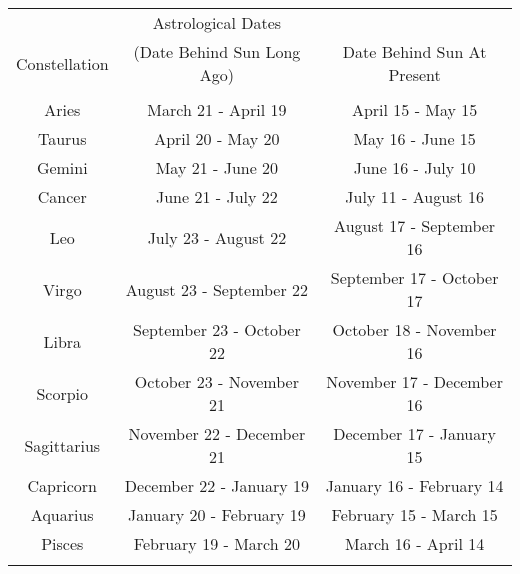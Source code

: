 \documentclass[11pt]{article}
\begin{document}
\begin{center}
	\begin{tabular}{ c c c }
		\hline
		             & Astrological Dates &                          \\ 
		Constellation \hspace{0.5in} & (Date Behind Sun Long Ago) & Date Behind Sun At Present                         \\ \hline
		& & \\ 
		Aries     \hspace{0.5in}  & March 21 - April 19       & April 15 - May 15         \\ 
		Taurus    \hspace{0.5in}  & April 20 - May 20         & May 16 - June 15          \\ 
		Gemini    \hspace{0.5in}  & May 21 - June 20          & June 16 - July 10         \\ 
		Cancer    \hspace{0.5in}  & June 21 - July 22         & July 11 - August 16       \\ 
		Leo        \hspace{0.5in} & July 23 - August 22       & August 17 - September 16  \\ 
		Virgo     \hspace{0.5in}  & August 23 - September 22  & September 17 - October 17 \\ 
		Libra      \hspace{0.5in} & September 23 - October 22 & October 18 - November 16  \\ 
		Scorpio    \hspace{0.5in} & October 23 - November 21  & November 17 - December 16 \\ 
		Sagittarius\hspace{0.5in} & November 22 - December 21 & December 17 - January 15  \\ 
		Capricorn \hspace{0.5in}  & December 22 - January 19  & January 16 - February 14  \\ 
		Aquarius   \hspace{0.5in} & January 20 - February 19  & February 15 - March 15    \\
		Pisces     \hspace{0.5in} & February 19 - March 20    & March 16 - April 14       \\  
		&                         &                         \\ \hline
	\end{tabular}
\end{center}
\end{document}

